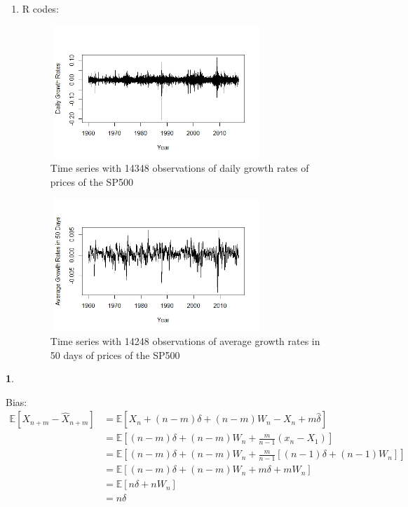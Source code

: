 \documentclass[10pt]{article}
\newtheorem{bonus}{\bm{$Bonus\;Problem$}}
\begin{document}
\begin{enumerate}[1)]
\item
R codes:
\begin{figure}[H]
  \centering
  \includegraphics[width=8cm,height=5cm]{p44a.jpeg}
  \caption{Time series with 14348 observations of daily growth rates of prices of the SP500}
\end{figure}
\begin{figure}[H]
  \centering
  \includegraphics[width=8cm,height=5cm]{p44b.jpeg}
  \caption{Time series with 14248 observations of average growth rates in 50 days of prices of the SP500}
\end{figure}

\end{enumerate}
\vspace{3mm}

\begin{bonus}
\end{bonus}
\vspace{3mm}

Bias:
\begin{align*}
\mathbb{E}[X_{n+m}-\hat{X}_{n+m}]&=\mathbb{E}[X_n+(n-m)\delta+(n-m)W_n-X_n+m\hat{\delta}]\\ %
&=\mathbb{E}[(n-m)\delta+(n-m)W_n+\frac{m}{n-1}(x_n-X_1)]\\
&=\mathbb{E}[(n-m)\delta+(n-m)W_n+\frac{m}{n-1}[(n-1)\delta+(n-1)W_n]]\\
&=\mathbb{E}[(n-m)\delta+(n-m)W_n+m\delta+mW_n]\\
&=\mathbb{E}[n\delta+nW_n]\\
&=n\delta
\end{align*}
\end{document}
